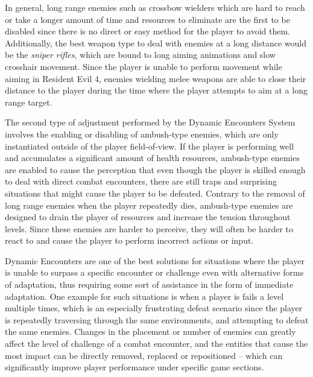 In general, long range enemies such as crossbow wielders which are hard to reach or take a longer amount of time and resources to eliminate are the first to be disabled since there is no direct or easy method for the player to avoid them. Additionally, the best weapon type to deal with enemies at a long distance would be the \emph{sniper rifles}, which are bound to long aiming animations and slow crosshair movement. Since the player is unable to perform movement while aiming in Resident Evil 4, enemies wielding melee weapons are able to close their distance to the player during the time where the player attempts to aim at a long range target.

The second type of adjustment performed by the Dynamic Encounters System involves the enabling or disabling of ambush-type enemies, which are only instantiated outside of the player field-of-view. If the player is performing well and accumulates a significant amount of health resources, ambush-type enemies are enabled to cause the perception that even though the player is skilled enough to deal with direct combat encounters, there are still traps and surprising situations that might cause the player to be defeated. Contrary to the removal of long range enemies when the player repeatedly dies, ambush-type enemies are designed to drain the player of resources and increase the tension throughout levels. Since these enemies are harder to perceive, they will often be harder to react to and cause the player to perform incorrect actions or input.




Dynamic Encounters are one of the best solutions for situations where the player is unable to surpass a specific encounter or challenge even with alternative forms of adaptation, thus requiring some sort of assistance in the form of immediate adaptation. One example for such situations is when a player is fails a level multiple times, which is an especially frustrating defeat scenario since the player is repeatedly traversing through the same environments, and attempting to defeat the same enemies. Changes in the placement or number of enemies can greatly affect the level of challenge of a combat encounter, and the entities that cause the most impact can be directly removed, replaced or repositioned -- which can significantly improve player performance under specific game sections.

